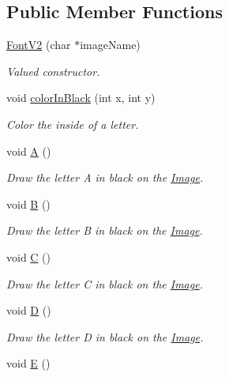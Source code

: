 \subsection*{Public Member Functions}
\begin{DoxyCompactItemize}
\item 
\mbox{\hyperlink{class_font_v2_aecf9c03af709aa99c23f5c785e798ef4}{Font\+V2}} (char $\ast$image\+Name)
\begin{DoxyCompactList}\small\item\em Valued constructor. \end{DoxyCompactList}\item 
void \mbox{\hyperlink{class_font_v2_a04f2501961bc286ce70fbb6a840b0e8a}{color\+In\+Black}} (int x, int y)
\begin{DoxyCompactList}\small\item\em Color the inside of a letter. \end{DoxyCompactList}\item 
void \mbox{\hyperlink{class_font_v2_ae1a96e014f4cc9e4447b0a2d947f4a33}{A}} ()
\begin{DoxyCompactList}\small\item\em Draw the letter A in black on the \mbox{\hyperlink{class_image}{Image}}. \end{DoxyCompactList}\item 
void \mbox{\hyperlink{class_font_v2_a0a895c96067874028864303ab64ce889}{B}} ()
\begin{DoxyCompactList}\small\item\em Draw the letter B in black on the \mbox{\hyperlink{class_image}{Image}}. \end{DoxyCompactList}\item 
void \mbox{\hyperlink{class_font_v2_ab7dc3a07d1442bd391513c4c202f2a43}{C}} ()
\begin{DoxyCompactList}\small\item\em Draw the letter C in black on the \mbox{\hyperlink{class_image}{Image}}. \end{DoxyCompactList}\item 
void \mbox{\hyperlink{class_font_v2_ab6a088abff91bacc1096b6008296142b}{D}} ()
\begin{DoxyCompactList}\small\item\em Draw the letter D in black on the \mbox{\hyperlink{class_image}{Image}}. \end{DoxyCompactList}\item 
void \mbox{\hyperlink{class_font_v2_a3dc7a171c913a94b688689c69abafeca}{E}} ()

\end{DoxyCompactItemize}
